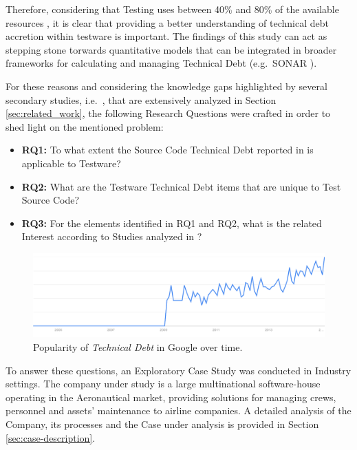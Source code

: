 Therefore, considering that Testing uses between 40\% and 80\% of the available resources \cite{exploratorying_testing_td}, it is clear that providing a better understanding of technical debt accretion within testware is important. The findings of this study can act as stepping stone torwards quantitative models that can be integrated in broader frameworks for calculating and managing Technical Debt (e.g.\ SONAR \cite{sonar_evaluate_td}).

For these reasons and considering the knowledge gaps highlighted by several secondary studies, i.e.\ \cite{mapping_study_td, exploration_of_td, exploration_of_td2}, that are extensively analyzed in Section \ref{sec:related_work}, the following Research Questions were crafted in order to shed light on the mentioned problem:

\begin{itemize}
    \itemsep0em

    \item \textbf{RQ1:} To what extent the Source Code Technical Debt reported in \cite{mapping_study_td} is applicable to Testware?

    \item \textbf{RQ2:} What are the Testware Technical Debt items that are unique to Test Source Code?

    \item \textbf{RQ3:} For the elements identified in RQ1 and RQ2, what is the related Interest according to Studies analyzed in \cite{mapping_study_td}?

\end{itemize}

\begin{figure}[h]
\centering
\includegraphics[width=\textwidth]{figure/technicalDebt.pdf}
\caption{Popularity of \textit{Technical Debt} in Google over time.}
\label{fig:technical_debt_trend}
\end{figure}



To answer these questions, an Exploratory Case Study was conducted in Industry settings. The company under study is a large multinational software-house operating in the Aeronautical market, providing solutions for managing crews, personnel and assets' maintenance to airline companies. A detailed analysis of the Company, its processes and the Case under analysis is provided in Section \ref{sec:case-description}.

